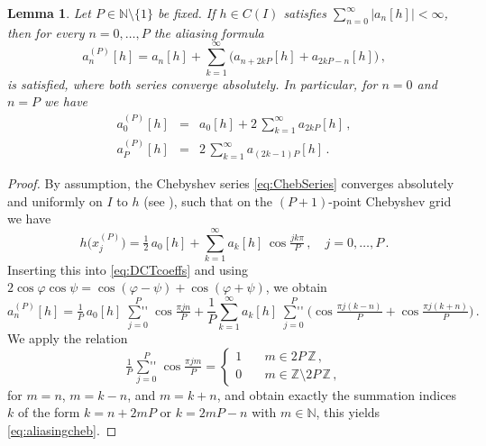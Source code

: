\documentclass[11pt,a4paper]{scrartcl}
\newcommand{\sumdprime}{\mathop{{\sum}''}\limits}
\newtheorem{lemma}[theorem]{Lemma}
\numberwithin{equation}{section}
\numberwithin{table}{section}
\numberwithin{figure}{section}
\newcommand{\Z}{\mathbb Z}
\newcommand{\N}{\mathbb N}
\begin{document}
\begin{lemma}
	\label{Lemma:aliasingcheb}
	Let $P \in \N \setminus \{1\}$ be fixed. If $h \in C(I)$ satisfies
	$\sum_{n=0}^{\infty}|a_n[h]| < \infty$, then for every $n =0,\ldots,P$
	the aliasing formula
	\begin{equation}
		\textstyle a_n^{(P)}[h]
		= a_n[h] + \sum\limits_{k=1}^{\infty}\bigl(a_{n+2kP}[h]+a_{2kP-n}[h]\bigr)\,,
		\label{eq:aliasingcheb}
	\end{equation}
	is satisfied, where both series converge absolutely. In particular, for $n=0$ and $n=P$ we have
\begin{eqnarray*}
\textstyle a_0^{(P)}[h] &=& \textstyle a_0[h] + 2\,\sum\limits_{k=1}^{\infty} a_{2kP}[h]\,,\\
\textstyle a_P^{(P)}[h] &=& \textstyle 2\, \sum\limits_{k=1}^{\infty}a_{(2k-1)P}[h]\,.
\end{eqnarray*}
\end{lemma}

\begin{proof} By assumption, the Chebyshev series \eqref{eq:ChebSeries}
converges absolutely and uniformly on $I$ to $h$ (see
\cite[Chapter~6]{PlPoStTa23}), such that on the $(P+1)$-point Chebyshev grid we have
$$
\textstyle h\big(x_j^{(P)}\big) = \tfrac12\,a_0[h] + \sum\limits_{k=1}^{\infty} a_k[h]\,\cos \tfrac{jk \pi}{P}\,, \quad j=0,\ldots, P\,.
$$
Inserting this into \eqref{eq:DCTcoeffs} and using $2\cos\varphi\cos\psi =
\cos(\varphi-\psi) + \cos(\varphi+\psi)$, we obtain
$$
\textstyle 	a_n^{(P)}[h] = \tfrac{1}{P}\, a_0[h]\, \sumdprime_{\!\!\!j=0}^{\!\!\!P} \cos \tfrac{\pi j n}{P} + \frac{1}{P}\sum\limits_{k=1}^{\infty} a_k[h]  \, \sumdprime_{\!\!\!j=0}^{\!\!\!P} \Big(\cos \tfrac{\pi j (k-n)}{P} + \cos \tfrac{\pi j (k+n)}{P} \Big)\,.
$$
 We apply the relation
$$
\textstyle \tfrac{1}{P} \sumdprime_{\!\!\!j=0}^{\!\!\!P}\cos \tfrac{\pi j m}{P} = \left\{ \begin{array}{ll} 1 &\quad m \in 2P\,\Z\,,\\
0 & \quad m \in \Z \setminus 2P\,\Z \,, \end{array}\right.
$$
 for $m = n$, $m = k-n$, and $m = k+n$, and obtain exactly the summation indices $k$ of the
form $k = n + 2mP$ or $k = 2mP - n$ with $m \in \N$,
 this yields
\eqref{eq:aliasingcheb}.
\end{proof}
\end{document}

